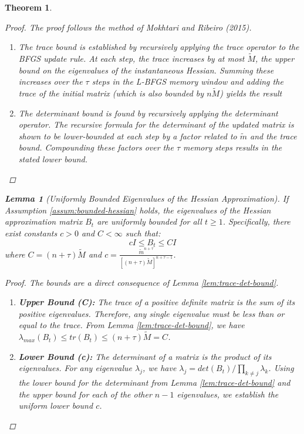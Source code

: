 \documentclass[a4paper,12pt]{article}
\newtheorem{theorem}{Theorem}
\newtheorem{lemma}{Lemma}
\begin{document}
\begin{theorem}
\begin{proof}
The proof follows the method of Mokhtari and Ribeiro (2015).
\begin{enumerate}
    \item The trace bound is established by recursively applying the trace operator to the BFGS update rule. At each step, the trace increases by at most $\tilde{M}$, the upper bound on the eigenvalues of the instantaneous Hessian. Summing these increases over the $\tau$ steps in the L-BFGS memory window and adding the trace of the initial matrix (which is also bounded by $n\tilde{M}$) yields the result 
    
    \item The determinant bound is found by recursively applying the determinant operator. The recursive formula for the determinant of the updated matrix is shown to be lower-bounded at each step by a factor related to $\tilde{m}$ and the trace bound. Compounding these factors over the $\tau$ memory steps results in the stated lower bound.
\end{enumerate}
\end{proof}

\begin{lemma}[Uniformly Bounded Eigenvalues of the Hessian Approximation]
\label{lem:eigenvalue-bound}
If Assumption \ref{assum:bounded-hessian} holds, the eigenvalues of the Hessian approximation matrix $B_t$ are uniformly bounded for all $t \ge 1$. Specifically, there exist constants $c>0$ and $C<\infty$ such that:
$$
cI \le B_t \le CI
$$
where $C = (n+\tau)\tilde{M}$ and $c = \frac{\tilde{m}^{n+\tau}}{[(n+\tau)\tilde{M}]^{n+\tau-1}}$.
\end{lemma}

\begin{proof}
The bounds are a direct consequence of Lemma \ref{lem:trace-det-bound}.
\begin{enumerate}
    \item \textbf{Upper Bound (C):} The trace of a positive definite matrix is the sum of its positive eigenvalues. Therefore, any single eigenvalue must be less than or equal to the trace. From Lemma \ref{lem:trace-det-bound}, we have $\lambda_{max}(B_t) \le tr(B_t) \le (n+\tau)\tilde{M} = C$.

    \item \textbf{Lower Bound (c):} The determinant of a matrix is the product of its eigenvalues. For any eigenvalue $\lambda_j$, we have $\lambda_j = det(B_t) / \prod_{k \ne j} \lambda_k$. Using the lower bound for the determinant from Lemma \ref{lem:trace-det-bound} and the upper bound for each of the other $n-1$ eigenvalues, we establish the uniform lower bound $c$.
\end{enumerate}
\end{proof}



\end{theorem}
\end{document}
